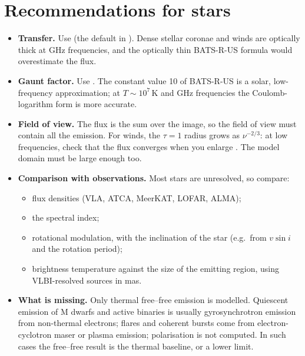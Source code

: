 \section{Recommendations for stars}
\begin{itemize}[itemsep=2pt]
\item \textbf{Transfer.} Use  (the default in ).
      Dense stellar coronae and winds are optically thick at GHz frequencies, and the
      optically thin BATS-R-US formula would overestimate the flux.
\item \textbf{Gaunt factor.} Use . The constant value 10 of BATS-R-US is
      a solar, low-frequency approximation; at $T\sim10^7$\,K and GHz frequencies the
      Coulomb-logarithm form is more accurate.
\item \textbf{Field of view.} The flux is the sum over the image, so the field of view must
      contain all the emission. For winds, the $\tau=1$ radius grows as $\nu^{-2/3}$:
      at low frequencies, check that the flux converges when you enlarge . The
      model domain must be large enough too.
\item \textbf{Comparison with observations.} Most stars are unresolved, so compare:
      \begin{itemize}[itemsep=0pt]
      \item flux densities (VLA, ATCA, MeerKAT, LOFAR, ALMA);
      \item the spectral index;
      \item rotational modulation, with the inclination of the star (e.g.\ from
            $v\sin i$ and the rotation period);
      \item brightness temperature against the size of the emitting region, using
            VLBI-resolved sources in mas.
      \end{itemize}
\item \textbf{What is missing.} Only thermal free--free emission is modelled. Quiescent
      emission of M dwarfs and active binaries is usually gyrosynchrotron emission from
      non-thermal electrons; flares and coherent bursts come from electron-cyclotron maser
      or plasma emission; polarisation is not computed. In such cases the free--free result
      is the thermal baseline, or a lower limit.
\end{itemize}

